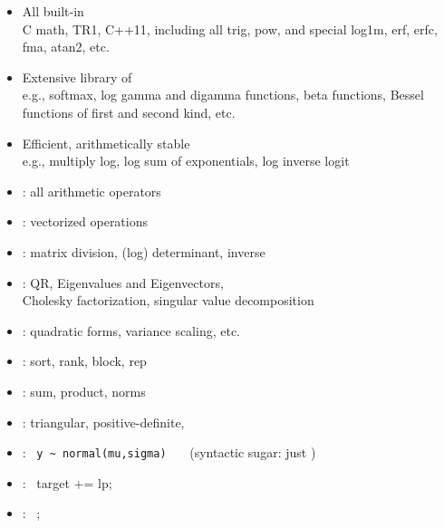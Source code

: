 \documentclass[10pt]{report}
\begin{document}
%
\begin{itemize}
\item All built-in 
  \\
  {\footnotesize C math, TR1, C++11, including all trig, pow, and
    special log1m, erf, erfc, fma, atan2, etc.}
\item Extensive library of 
  \\
  {\footnotesize e.g., softmax,
    log gamma and digamma functions, beta functions, Bessel functions of
    first and second kind, etc.}
\item Efficient, arithmetically stable 
  \\
  {\footnotesize e.g., multiply log, log sum of
    exponentials, log inverse logit}
\end{itemize}


%
\begin{itemize}\small
\item {}: all arithmetic operators
\item {}: vectorized operations
\item {}: matrix division, (log) determinant,
  inverse
\item {}: QR, Eigenvalues and Eigenvectors,
  \\
  Cholesky factorization, singular value decomposition
\item {}: quadratic forms, variance scaling, etc.
\item {}: sort, rank, block, rep
\item {}: sum, product, norms
\item {}: triangular, positive-definite,
\end{itemize}


%
\begin{itemize}
\item {}: \ {\footnotesize \Verb|y ~ normal(mu,sigma)|}
  \ \ \ {\footnotesize (syntactic sugar: just )}
\item {}: \ {\footnotesize target += lp;}
\item {}: \  {\footnotesize {};}
\end{itemize}
\end{document}
